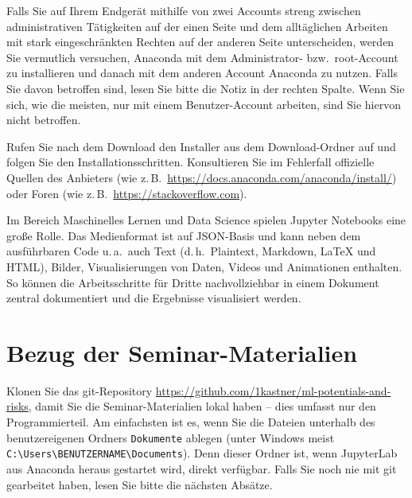 \documentclass{tufte-handout}
\begin{document}
Falls Sie auf Ihrem Endgerät mithilfe von zwei Accounts streng zwischen administrativen Tätigkeiten auf der einen Seite und dem alltäglichen Arbeiten mit stark eingeschränkten Rechten auf der anderen Seite unterscheiden, werden Sie vermutlich versuchen, Anaconda mit dem Administrator- bzw.\ root-Account zu installieren und danach mit dem anderen Account Anaconda zu nutzen.
Falls Sie davon betroffen sind, lesen Sie bitte die Notiz in der rechten Spalte.
Wenn Sie sich, wie die meisten, nur mit einem Benutzer-Account arbeiten, sind Sie hiervon nicht betroffen.

Rufen Sie nach dem Download den Installer aus dem Download-Ordner auf und folgen Sie den Installationsschritten.
Konsultieren Sie im Fehlerfall offizielle Quellen des Anbieters
(wie z.\,B.\ \url{https://docs.anaconda.com/anaconda/install/})
oder Foren
(wie z.\,B.\ \url{https://stackoverflow.com}).


Im Bereich Maschinelles Lernen und Data Science spielen Jupyter Notebooks eine  große Rolle.
Das Medienformat ist auf JSON-Basis und kann neben dem ausführbaren Code
u.\,a.\ auch
Text (d.\,h.\ Plaintext, Markdown, LaTeX und HTML),
Bilder,
Visualisierungen von Daten,
Videos und
Animationen
enthalten.
So können die Arbeitsschritte für Dritte nachvollziehbar in einem Dokument zentral dokumentiert und die Ergebnisse visualisiert werden.


\section{Bezug der Seminar-Materialien}
\label{sec:git-clone}

Klonen Sie das git-Repository
\url{https://github.com/1kastner/ml-potentials-and-risks},
damit Sie die Seminar-Materialien lokal haben -- dies umfasst nur den Programmierteil.
Am einfachsten ist es, wenn Sie die Dateien unterhalb des benutzer\-eigenen Ordners \texttt{Dokumente} ablegen
(unter Windows meist \texttt{C:\textbackslash{}Users\textbackslash{}BENUTZERNAME\textbackslash{}Documents}).
Denn dieser Ordner ist, wenn JupyterLab aus Anaconda heraus gestartet wird, direkt verfügbar.
Falls Sie noch nie mit git gearbeitet haben, lesen Sie bitte die nächsten Absätze.
\end{document}
